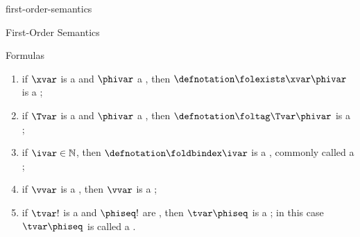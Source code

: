 \documentclass{stex}
\begin{document}
\begin{smodule}{first-order-semantics}
\begin{sfragment}[id=sec:first-order-semantics]{First-Order Semantics}
\begin{sfragment}[id=sec:formulas]{Formulas}
\begin{sparagraph}[style=symdoc,for={formula,foltrue,folfalse,folneg,folconj,foldisj,folimpl,folequiv,folforall,folexists,foltag,foldbindex,folsem}]
\begin{enumerate}
          then $\defnotation\folforall\xvar\phivar$ is a ;
        \item if $\xvar$ is a  and $\phivar$ a ,
          then $\defnotation\folexists\xvar\phivar$ is a ;
        \item if $\Tvar$ is a  and $\phivar$ a ,
          then $\defnotation\foltag\Tvar\phivar$ is a ;
        \item if $\ivar\in\mathbb N$,
          then $\defnotation\foldbindex\ivar$ is a ,
          commonly called a ;
        \item if $\vvar$ is a ,
          then $\vvar$ is a ;
        \item if $\tvar!$ is a  and $\phiseq!$ are ,
          then $\tvar\phiseq$ is a ;
          in this case $\tvar\phiseq$ is called a .
      \end{enumerate}
    \end{sparagraph}
  \end{sfragment}
\end{sfragment}

\ifinputref\else{}\fi

\end{smodule}
\end{document}
